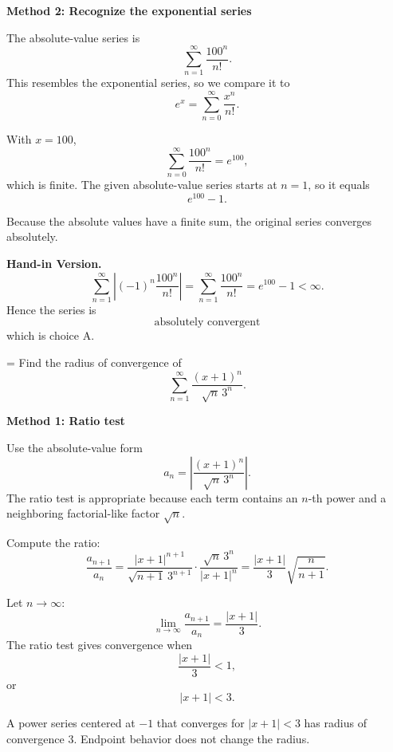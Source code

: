 \documentclass[a4paper,12pt,twocolumn]{article}
\newlength{\problemnumberwidth}
\newenvironment{solutionbox}{\begin{framed}}{\end{framed}}
\newcommand{\problem}[3]{%
  \Needspace{10\baselineskip}%
  \phantomsection\label{#1}%
  \par\vspace{0.8em}%
  \noindent
  \hangindent=\problemnumberwidth
  \hangafter=1
  \makebox[\problemnumberwidth][l]{\textbf{#2.}}#3\par
}
\begin{document}
\begin{solutionbox}
\textbf{Method 2: Recognize the exponential series}

\begin{steps}
\item The absolute-value series is
\[
\sum_{n=1}^{\infty}\frac{100^n}{n!}.
\]
This resembles the exponential series, so we compare it to
\[
e^x=\sum_{n=0}^{\infty}\frac{x^n}{n!}.
\]

\item With \(x=100\),
\[
\sum_{n=0}^{\infty}\frac{100^n}{n!}=e^{100},
\]
which is finite. The given absolute-value series starts at \(n=1\), so it equals
\[
e^{100}-1.
\]

\item Because the absolute values have a finite sum, the original series converges absolutely.
\end{steps}

\textbf{Hand-in Version.}
\[
\sum_{n=1}^{\infty}\left|(-1)^n\frac{100^n}{n!}\right|
=\sum_{n=1}^{\infty}\frac{100^n}{n!}
=e^{100}-1<\infty.
\]
Hence the series is
\[
\boxed{\text{absolutely convergent}}
\]
which is choice \(\boxed{\text{A}}\).
\end{solutionbox}

\problem{prob:vi}{vi}{Find the radius of convergence of
\[
\sum_{n=1}^{\infty}\frac{(x+1)^n}{\sqrt n\,3^n}.
\]}

\begin{solutionbox}
\textbf{Method 1: Ratio test}

\begin{steps}
\item Use the absolute-value form
\[
a_n=\left|\frac{(x+1)^n}{\sqrt n\,3^n}\right|.
\]
The ratio test is appropriate because each term contains an \(n\)-th power and a neighboring factorial-like factor \(\sqrt n\).

\item Compute the ratio:
\[
\frac{a_{n+1}}{a_n}
=\frac{|x+1|^{n+1}}{\sqrt{n+1}\,3^{n+1}}
\cdot
\frac{\sqrt n\,3^n}{|x+1|^n}
=\frac{|x+1|}{3}\sqrt{\frac{n}{n+1}}.
\]

\item Let \(n\to\infty\):
\[
\lim_{n\to\infty}\frac{a_{n+1}}{a_n}
=\frac{|x+1|}{3}.
\]
The ratio test gives convergence when
\[
\frac{|x+1|}{3}<1,
\]
or
\[
|x+1|<3.
\]

\item A power series centered at \(-1\) that converges for \(|x+1|<3\) has radius of convergence \(3\). Endpoint behavior does not change the radius.
\end{steps}
\end{solutionbox}
\end{document}
